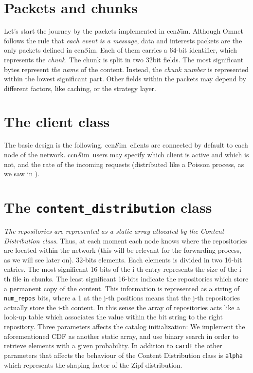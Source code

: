 \documentclass{book}
\newcommand{\ccnsim}{ccn$\mathcal{S}$im}
\begin{document}
\section{Packets and chunks}
Let's start the journey by the packets implemented in \ccnsim. Although Omnet follows the rule that \emph{each event is a message}, data and interests packets are the only packets defined in \ccnsim. Each of them carries a 64-bit identifier, which represents the  \emph{chunk}. The chunk is split in two 32bit fields. The most significant bytes represent \emph{the name} of the content. Instead, the \emph{chunk number} is represented  within the lowest significant part. Other fields within the packets may depend by different factors, like caching, or the strategy layer.
\section{The client class}
The basic design is the following. \ccnsim\ clients are connected by default to each node of the network. \ccnsim\ users may specify which client is active and which is not, and the rate of the incoming requests (distributed like a Poisson process, as we saw in ).  
\section{The \texttt{content\_distribution} class}
	\emph{The repositories are represented as a static array allocated by the Content Distribution class}. Thus, at each moment each node knows where the repositories are located within the network (this will be relevant for the forwarding process, as we will see later on).
32-bits elements. Each elements is divided in two 16-bit entries. The most significant 16-bits of the i-th entry represents the size of the i-th file in chunks. The least significant 16-bits indicate the repositories which store a permanent copy of the content. This information is represented as  a string of \verb|num_repos| bits, where a 1 at the j-th positions means that the j-th repositories actually store the i-th content. In this sense the array of repositories acts like a look-up table which associates the value within the bit string to the right repository. Three parameters affects the catalog initialization:
We implement the aforementioned CDF as another static array, and use binary search in order to retrieve elements with a given probability. In addition to \verb|cardF| the other parameters that affects the behaviour of the Content Distribution class is \verb|alpha| which represents the shaping factor of the Zipf distribution. 
\end{document}
